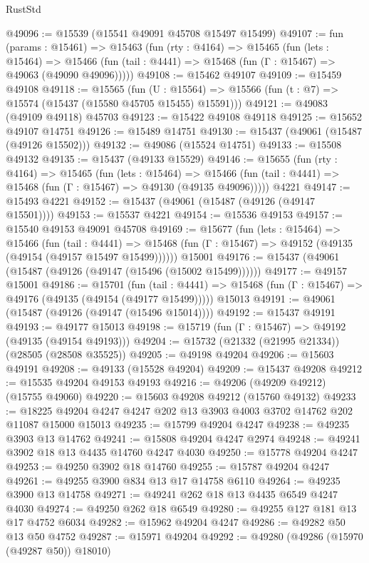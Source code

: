 \begin{lexlean}{RustStd}
\begin{coremodule}
@49096 := @15539 (@15541 @49091 @45708 @15497 @15499)
@49107 := fun (params : @15461) =>
  @15463
    (fun (rty : @4164) =>
    @15465
      (fun (lets : @15464) =>
      @15466 (fun (tail : @4441) => @15468 (fun (Γ : @15467) => @49063 (@49090 @49096)))))
@49108 := @15462 @49107
@49109 := @15459 @49108
@49118 := @15565
    (fun (U : @15564) => @15566 (fun (t : @7) => @15574 (@15437 (@15580 @45705 @15455) @15591)))
@49121 := @49083 (@49109 @49118) @45703
@49123 := @15422 @49108 @49118
@49125 := @15652 @49107 @14751
@49126 := @15489 @14751
@49130 := @15437 (@49061 (@15487 (@49126 @15502)))
@49132 := @49086 (@15524 @14751)
@49133 := @15508 @49132
@49135 := @15437 (@49133 @15529)
@49146 := @15655
    (fun (rty : @4164) =>
    @15465
      (fun (lets : @15464) =>
      @15466 (fun (tail : @4441) => @15468 (fun (Γ : @15467) => @49130 (@49135 @49096)))))
    @4221
@49147 := @15493 @4221
@49152 := @15437 (@49061 (@15487 (@49126 (@49147 @15501))))
@49153 := @15537 @4221
@49154 := @15536 @49153
@49157 := @15540 @49153 @49091 @45708
@49169 := @15677
    (fun (lets : @15464) =>
    @15466
      (fun (tail : @4441) =>
      @15468 (fun (Γ : @15467) => @49152 (@49135 (@49154 (@49157 @15497 @15499))))))
    @15001
@49176 := @15437 (@49061 (@15487 (@49126 (@49147 (@15496 (@15002 @15499))))))
@49177 := @49157 @15001
@49186 := @15701
    (fun (tail : @4441) => @15468 (fun (Γ : @15467) => @49176 (@49135 (@49154 (@49177 @15499)))))
    @15013
@49191 := @49061 (@15487 (@49126 (@49147 (@15496 @15014))))
@49192 := @15437 @49191
@49193 := @49177 @15013
@49198 := @15719 (fun (Γ : @15467) => @49192 (@49135 (@49154 @49193)))
@49204 := @15732 (@21332 (@21995 @21334)) (@28505 (@28508 @35525))
@49205 := @49198 @49204
@49206 := @15603 @49191
@49208 := @49133 (@15528 @49204)
@49209 := @15437 @49208
@49212 := @15535 @49204 @49153 @49193
@49216 := @49206 (@49209 @49212) (@15755 @49060)
@49220 := @15603 @49208 @49212 (@15760 @49132)
@49233 := @18225 @49204 @4247 @4247 @202 @13 @3903 @4003 @3702 @14762 @202 @11087 @15000 @15013
@49235 := @15799 @49204 @4247
@49238 := @49235 @3903 @13 @14762
@49241 := @15808 @49204 @4247 @2974
@49248 := @49241 @3902 @18 @13 @4435 @14760 @4247 @4030
@49250 := @15778 @49204 @4247
@49253 := @49250 @3902 @18 @14760
@49255 := @15787 @49204 @4247
@49261 := @49255 @3900 @834 @13 @17 @14758 @6110
@49264 := @49235 @3900 @13 @14758
@49271 := @49241 @262 @18 @13 @4435 @6549 @4247 @4030
@49274 := @49250 @262 @18 @6549
@49280 := @49255 @127 @181 @13 @17 @4752 @6034
@49282 := @15962 @49204 @4247
@49286 := @49282 @50 @13 @50 @4752
@49287 := @15971 @49204
@49292 := @49280 (@49286 (@15970 (@49287 @50)) @18010)

\end{coremodule}
\end{lexlean}
